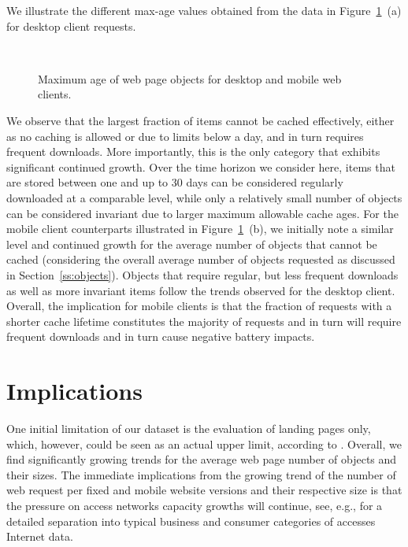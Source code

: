 \documentclass[onecolumn,12pt]{IEEEtran}
\begin{document}
We illustrate the different max-age values obtained from the data in Figure~\ref{fig:maxage}~(a) for desktop client requests.
\begin{figure}
	\centering
	\qquad
	\\
	\caption{Maximum age of web page objects for desktop and mobile web clients.\label{fig:maxage}}
\end{figure}
We observe that the largest fraction of items cannot be cached effectively, either as no caching is allowed or due to limits below a day, and in turn requires frequent downloads. 
More importantly, this is the only category that exhibits significant continued growth.
Over the time horizon we consider here, items that are stored between one and up to 30 days can be considered regularly downloaded at a comparable level, while only a relatively small number of objects can be considered invariant due to larger maximum allowable cache ages.
For the mobile client counterparts illustrated in Figure~\ref{fig:maxage}~(b), we initially note a similar level and continued growth for the average number of objects that cannot be cached (considering the overall average number of objects requested as discussed in Section~\ref{ss:objects}).
Objects that require regular, but less frequent downloads as well as more invariant items follow the trends observed for the desktop client.
Overall, the implication for mobile clients is that the fraction of requests with a shorter cache lifetime constitutes the majority of requests and in turn will require frequent downloads and in turn cause negative battery impacts.







\section{Implications}
\label{s:discuss}
One initial limitation of our dataset is the evaluation of landing pages only, which, however, could be seen as an actual upper limit, according to \cite{BuMaSe13}. 
Overall, we find significantly growing trends for the average web page number of objects and their sizes.
The immediate implications from the growing trend of the number of web request per fixed and mobile website versions and their respective size is that the pressure on access networks capacity growths will continue, see, e.g., \cite{Ci13} for a detailed separation into typical business and consumer categories of accesses Internet data.
\end{document}
